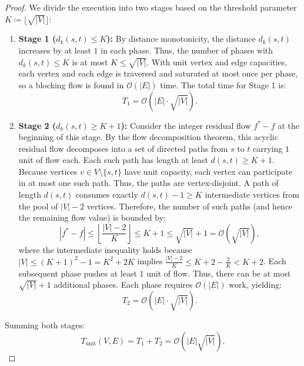 \documentclass[11pt, letterpaper]{article}
\begin{document}
\begin{proof}
We divide the execution into two stages based on the threshold parameter $K \coloneqq \lfloor \sqrt{|V|} \rfloor$:
\begin{enumerate}
    \item \textbf{Stage 1 ($d_k(s, t) \le K$):} By distance monotonicity, the distance $d_k(s, t)$ increases by at least $1$ in each phase. Thus, the number of phases with $d_k(s, t) \le K$ is at most $K \le \sqrt{|V|}$. 
    With unit vertex and edge capacities, each vertex and each edge is traversed and saturated at most once per phase, so a blocking flow is found in $\mathcal{O}(|E|)$ time. The total time for Stage 1 is:
    \begin{equation}
        T_1 = \mathcal{O}(|E| \cdot \sqrt{|V|}).
    \end{equation}
    \item \textbf{Stage 2 ($d_k(s, t) \ge K + 1$):} Consider the integer residual flow $f^* - f$ at the beginning of this stage. By the flow decomposition theorem, this acyclic residual flow decomposes into a set of directed paths from $s$ to $t$ carrying $1$ unit of flow each. Each such path has length at least $d(s, t) \ge K + 1$.
    Because vertices $v \in V \setminus \{s, t\}$ have unit capacity, each vertex can participate in at most one such path. Thus, the paths are vertex-disjoint. A path of length $d(s, t)$ consumes exactly $d(s, t) - 1 \ge K$ intermediate vertices from the pool of $|V| - 2$ vertices. Therefore, the number of such paths (and hence the remaining flow value) is bounded by:
    \begin{equation}
        |f^* - f| \le \left\lfloor \frac{|V|-2}{K} \right\rfloor \le K + 1 \le \sqrt{|V|} + 1 = \mathcal{O}(\sqrt{|V|}),
    \end{equation}
    where the intermediate inequality holds because $|V| \le (K+1)^2 - 1 = K^2 + 2K$ implies $\frac{|V|-2}{K} \le K + 2 - \frac{2}{K} < K + 2$.
    Each subsequent phase pushes at least $1$ unit of flow. Thus, there can be at most $\sqrt{|V|} + 1$ additional phases. Each phase requires $\mathcal{O}(|E|)$ work, yielding:
    \begin{equation}
        T_2 = \mathcal{O}(|E| \cdot \sqrt{|V|}).
    \end{equation}
\end{enumerate}
Summing both stages:
\begin{equation}
    T_{\text{unit}}(V, E) = T_1 + T_2 = \mathcal{O}(|E|\sqrt{|V|}).
\end{equation}
\end{proof}
\end{document}
